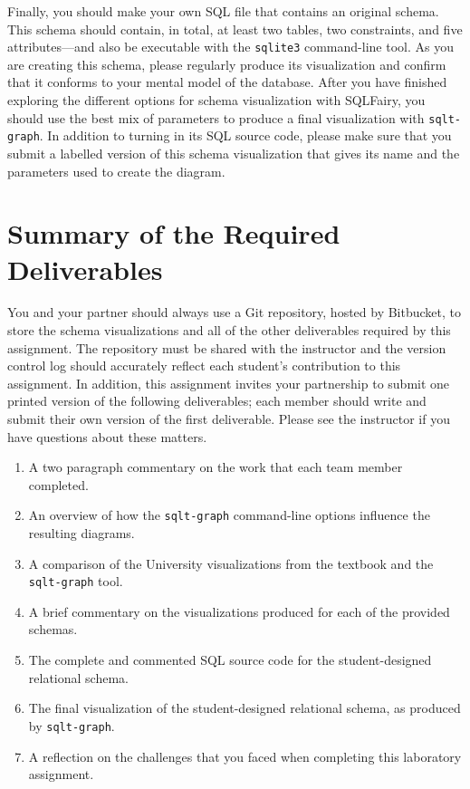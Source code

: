 Finally, you should make your own SQL file that contains an original schema.  This schema should contain, in total, at
least two tables, two constraints, and five attributes---and also be executable with the {\tt sqlite3} command-line
tool. As you are creating this schema, please regularly produce its visualization and confirm that it conforms to your
mental model of the database.  After you have finished exploring the different options for schema visualization with
SQLFairy, you should use the best mix of parameters to produce a final visualization with {\tt sqlt-graph}.  In addition
to turning in its SQL source code, please make sure that you submit a labelled version of this schema visualization that
gives its name and the parameters used to create the diagram. 

\section*{Summary of the Required Deliverables}

You and your partner should always use a Git repository, hosted by Bitbucket, to store the schema visualizations and
all of the other deliverables required by this assignment. The repository must be shared with the instructor and
the version control log should accurately reflect each student's contribution to this assignment. In addition, this
assignment invites your partnership to submit one printed version of the following deliverables; each member should
write and submit their own version of the first deliverable. Please see the instructor if you have questions about
these matters.


\begin{enumerate}
  \setlength{\itemsep}{0pt}
  \item A two paragraph commentary on the work that each team member completed. 
  \item An overview of how the {\tt sqlt-graph} command-line options influence the resulting diagrams.
  \item A comparison of the University visualizations from the textbook and the {\tt sqlt-graph} tool.
  \item A brief commentary on the visualizations produced for each of the provided schemas.
  \item The complete and commented SQL source code for the student-designed relational schema.
  \item The final visualization of the student-designed relational schema, as produced by {\tt sqlt-graph}.
  \item A reflection on the challenges that you faced when completing this laboratory assignment.
\end{enumerate}

